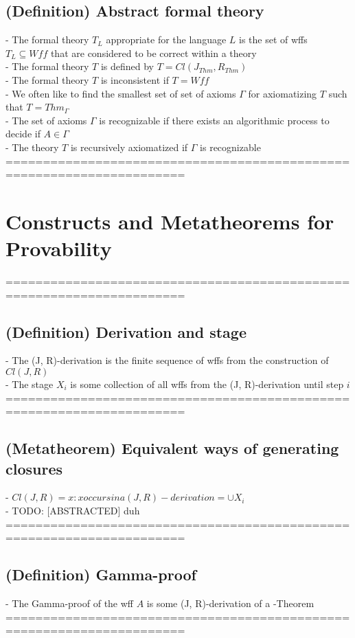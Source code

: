 \documentclass{article}
\begin{document}
\subsection{(Definition) Abstract formal theory}
	- The formal theory $T_L$ appropriate for the language $L$ is the set of wffs $T_L \subseteq Wff$ that are considered to be correct within a theory \\
	- The formal theory $T$ is defined by $T = Cl(J_{Thm}, R_{Thm})$ \\
	- The formal theory $T$ is inconsistent if $T = Wff$ \\
	- We often like to find the smallest set of set of axioms $\Gamma$ for axiomatizing $T$ such that $T = Thm_\Gamma$ \\
	- The set of axioms $\Gamma$ is recognizable if there exists an algorithmic process to decide if $A \in \Gamma$ \\
	- The theory $T$ is recursively axiomatized if $\Gamma$ is recognizable \\
	======================================================================

\section{Constructs and Metatheorems for Provability}
	======================================================================
\subsection{(Definition) Derivation and stage}
	- The (J, R)-derivation is the finite sequence of wffs from the construction of $Cl(J, R)$ \\
	- The stage $X_i$ is some collection of all wffs from the (J, R)-derivation until step $i$ \\
	======================================================================
\subsection{(Metatheorem) Equivalent ways of generating closures}
	- $Cl(J, R) = {x: x occurs in a (J, R)-derivation} = \cup X_i$ \\
	- TODO: [ABSTRACTED] duh
	======================================================================
\subsection{(Definition) Gamma-proof}
	- The Gamma-proof of the wff $A$ is some (J, R)-derivation of a \Gamma-Theorem
	======================================================================
\end{document}
